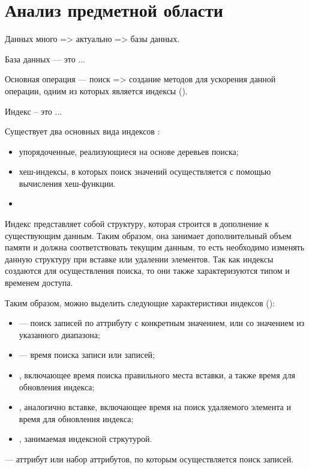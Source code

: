 \chapter{Анализ предметной области}

Данных много => актуально => базы данных.

База данных --- это ...

Основная операция --- поиск => создание методов для ускорения данной операции,
одним из которых является индексы ().

Индекс -- это ...

Существует два основных вида индексов :

\begin{itemize}
    \item упорядоченные, реализующиеся на основе деревьев поиска;
    \item хеш-индексы, в которых поиск значений осуществляется с помощью
        вычисления хеш-функции.
    \item {}
\end{itemize}

Индекс представляет собой структуру, которая строится в дополнение к
существующим данным. Таким образом, она занимает дополнительный объем памяти и
должна соответствовать текущим данным, то есть необходимо изменять данную
структуру при вставке или удалении элементов. Так как индексы создаются для
осуществления поиска, то они также характеризуются типом и временем доступа.

Таким образом, можно выделить следующие характеристики индексов ():


\begin{itemize}
    \item {} --- поиск записей по аттрибуту с конкретным
        значением, или со значением из указанного диапазона;
    \item {} --- время поиска записи или записей;
    \item {}, включающее время поиска правильного места вставки, а
        также время для обновления индекса;
    \item {}, аналогично вставке, включающее время на поиск
        удаляемого элемента и время для обновления индекса;
    \item {}, занимаемая индексной стркутурой.
\end{itemize}

 --- аттрибут или набор аттрибутов, по которым осуществляется
поиск записей.
